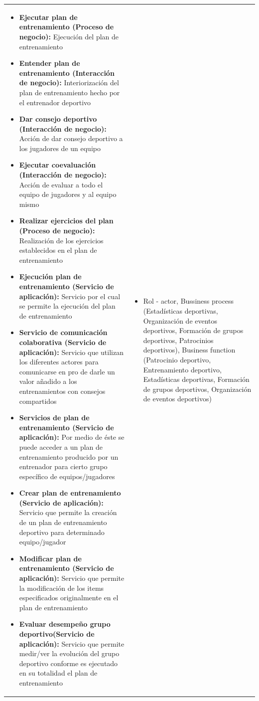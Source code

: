 \begin{table}[!htb]
\begin{center}
{\begin{tabular}{|p{7cm}|p{4cm}|}
\begin{itemize}
				\item \textbf{Ejecutar plan de entrenamiento (Proceso de negocio):} Ejecución del plan de entrenamiento
				\item \textbf{Entender plan de entrenamiento (Interacción de negocio):} Interiorización del plan de entrenamiento hecho por el entrenador deportivo
				\item \textbf{Dar consejo deportivo (Interacción de negocio):} Acción de dar consejo deportivo a los jugadores de un equipo
				\item \textbf{Ejecutar coevaluación (Interacción de negocio):} Acción de evaluar a todo el equipo de jugadores y al equipo mismo
				\item \textbf{Realizar ejercicios del plan (Proceso de negocio):} Realización de los ejercicios establecidos en el plan de entrenamiento
				\item \textbf{Ejecución plan de entrenamiento (Servicio de aplicación):} Servicio por el cual se permite la ejecución del plan de entrenamiento
				\item \textbf{Servicio de comunicación colaborativa (Servicio de aplicación):} Servicio que utilizan los diferentes actores para comunicarse en pro de darle un valor añadido a los entrenamientos con consejos compartidos
				\item \textbf{Servicios de plan de entrenamiento (Servicio de aplicación):} Por medio de éste se puede acceder a un plan de entrenamiento producido por un entrenador para cierto grupo específico de equipos/jugadores
				\item \textbf{Crear plan de entrenamiento (Servicio de aplicación):} Servicio que permite la creación de un plan de entrenamiento deportivo para determinado equipo/jugador
				\item \textbf{Modificar plan de entrenamiento (Servicio de aplicación):} Servicio que permite la modificación de los items especificados originalmente en el plan de entrenamiento
				\item \textbf{Evaluar desempeño grupo deportivo(Servicio de aplicación):} Servicio que permite medir/ver la evolución del grupo deportivo conforme es ejecutado en su totalidad el plan de entrenamiento
			\end{itemize} 
			&
			\begin{itemize}
				\item Rol - actor, Bussiness process (Estadísticas deportivas, Organización de eventos deportivos, Formación de grupos deportivos, Patrocinios deportivos), Business function (Patrocinio deportivo, Entrenamiento deportivo, Estadísticas deportivas, Formación de grupos deportivos, Organización de eventos deportivos)

\end{itemize}
\end{tabular}}
\end{center}
\end{table}
